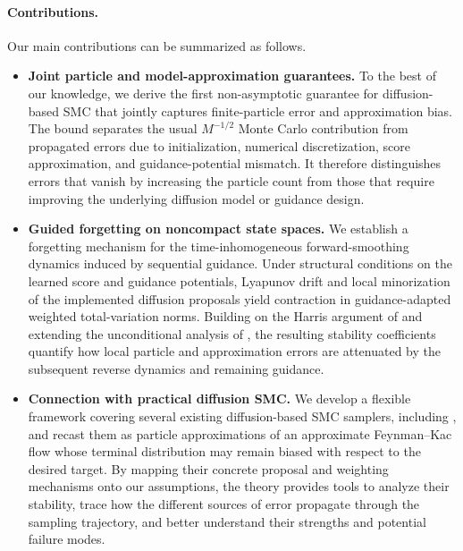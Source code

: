\documentclass[11pt]{article}
\theoremstyle{plain}
\theoremstyle{definition}
\theoremstyle{remark}
\begin{document}
\paragraph{Contributions.}
%
Our main contributions can be summarized as follows.
%
\begin{itemize}[leftmargin=*,itemsep=1pt]
%
\item
\textbf{Joint particle and model-approximation guarantees.}
To the best of our knowledge, we derive the first non-asymptotic guarantee for diffusion-based SMC that jointly captures finite-particle error and approximation bias. The bound separates the usual $M^{-1/2}$ Monte Carlo contribution from propagated errors due to initialization, numerical discretization, score approximation, and guidance-potential mismatch. It therefore distinguishes errors that vanish by increasing the particle count from those that require improving the underlying diffusion model or guidance design.

\item \textbf{Guided forgetting on noncompact state spaces.}
We establish a forgetting mechanism for the time-inhomogeneous forward-smoothing dynamics induced by sequential guidance. Under structural conditions on the learned score and guidance potentials, Lyapunov drift and local minorization of the implemented diffusion proposals yield contraction in guidance-adapted weighted total-variation norms. Building on the Harris argument of \citet{HairerMattingly2008} and extending the unconditional analysis of \citet{strasman2026forgetting}, the resulting stability coefficients quantify how local particle and approximation errors are attenuated by the subsequent reverse dynamics and remaining guidance.

\item \textbf{Connection with practical diffusion SMC.}
We develop a flexible framework covering several existing diffusion-based SMC samplers, including \citet{wu2023practical,cardoso2024monte}, and recast them as particle approximations of an approximate Feynman--Kac flow whose terminal distribution may remain biased with respect to the desired target. By mapping their concrete proposal and weighting mechanisms onto our assumptions, the theory provides tools to analyze their stability, trace how the different sources of error propagate through the sampling trajectory, and better understand their strengths and potential failure modes.
\end{itemize}
\end{document}

